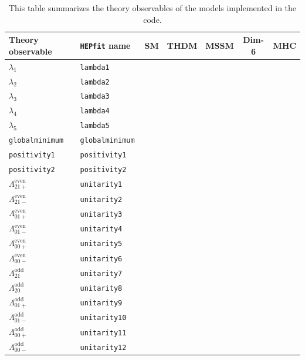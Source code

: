 \documentclass[aps,superscriptaddress,nofootinbib,floatfix,notitlepage]{revtex4-1}
\newcommand{\HEPfit}{\texttt{HEPfit}\xspace}
\begin{document}
\begin{table}
  \centering
  \begin{tabular}{|l|l|c|c|c|c|c|}
    \hline
    \textbf{Theory observable} & \textbf{\HEPfit name} & \textbf{SM} & \textbf{THDM} & \textbf{MSSM} & \textbf{Dim-6} & \textbf{MHC} \\
    \hline
	$\lambda_1$ & \tt{lambda1} & & \checkmark & & &\\
    \hline
	$\lambda_2$ & \tt{lambda2} & & \checkmark & & &\\
    \hline
	$\lambda_3$ & \tt{lambda3} & & \checkmark & & &\\
    \hline
	$\lambda_4$ & \tt{lambda4} & & \checkmark & & &\\
    \hline
	$\lambda_5$ & \tt{lambda5} & & \checkmark & & &\\
    \hline
	\texttt{globalminimum}\:[GeV$^4$] & \tt{globalminimum} & & \checkmark & & &\\
    \hline
	\tt{positivity1} & \tt{positivity1} & & \checkmark & & &\\
    \hline
	\tt{positivity2} & \tt{positivity2} & & \checkmark & & &\\
    \hline
	$\Lambda^{\text{even}}_{21+}$ & \tt{unitarity1} & & \checkmark & & &\\
    \hline
	$\Lambda^{\text{even}}_{21-}$ & \tt{unitarity2} & & \checkmark & & &\\
    \hline
	$\Lambda^{\text{even}}_{01+}$ & \tt{unitarity3} & & \checkmark & & &\\
    \hline
	$\Lambda^{\text{even}}_{01-}$ & \tt{unitarity4} & & \checkmark & & &\\
    \hline
	$\Lambda^{\text{even}}_{00+}$ & \tt{unitarity5} & & \checkmark & & &\\
    \hline
	$\Lambda^{\text{even}}_{00-}$ & \tt{unitarity6} & & \checkmark & & &\\
    \hline
	$\Lambda^{\text{odd}}_{21}$ & \tt{unitarity7} & & \checkmark & & &\\
    \hline
	$\Lambda^{\text{odd}}_{20}$ & \tt{unitarity8} & & \checkmark & & &\\
    \hline
	$\Lambda^{\text{odd}}_{01+}$ & \tt{unitarity9} & & \checkmark & & &\\
    \hline
	$\Lambda^{\text{odd}}_{01-}$ & \tt{unitarity10} & & \checkmark & & &\\
    \hline
	$\Lambda^{\text{odd}}_{00+}$ & \tt{unitarity11} & & \checkmark & & &\\
    \hline
	$\Lambda^{\text{odd}}_{00-}$ & \tt{unitarity12} & & \checkmark & & &\\
    \hline
  \end{tabular}
  \caption{This table summarizes the theory observables of the models
    implemented in the code.}
  \label{tab:summarytheory}
\end{table}
\end{document}
